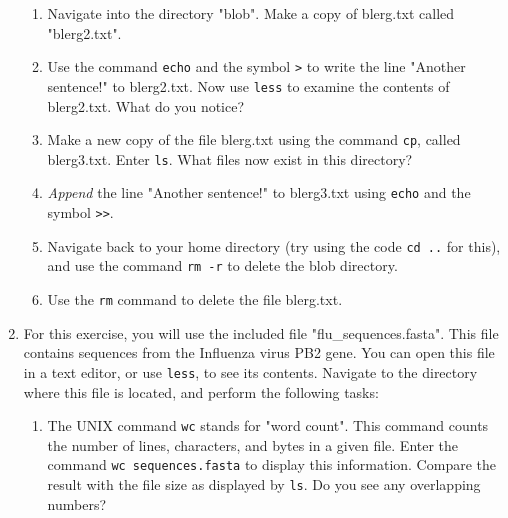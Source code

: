 \documentclass{article}[12pt]
\newcommand{\code}[1]{\texttt{#1}}  %
\begin{document}
\begin{enumerate}[itemsep=5ex]
\begin{enumerate}[itemsep=2ex]
		\item Navigate into the directory "blob". Make a copy of blerg.txt called "blerg2.txt".
		
		\item Use the command \code{echo} and the symbol \code{>} to write the line "Another sentence!" to blerg2.txt. Now use \code{less} to examine the contents of blerg2.txt. What do you notice?
		
		\item Make a new copy of the file blerg.txt using the command \code{cp}, called blerg3.txt. Enter \code{ls}. What files now exist in this directory?
		
		\item \emph{Append} the line "Another sentence!" to blerg3.txt using \code{echo} and the symbol \code{>>}. 
		
		\item Navigate back to your home directory (try using the code \code{cd ..} for this), and use the command \code{rm -r} to delete the blob directory.	
	
		\item Use the \code{rm} command to delete the file blerg.txt.
	\end{enumerate} 
	
%			
%			
	
	
	\item For this exercise, you will use the included file "flu\_sequences.fasta". This file contains sequences from the Influenza virus PB2 gene. You can open this file in a text editor, or use \code{less}, to see its contents. Navigate to the directory where this file is located, and perform the following tasks:
	\begin{enumerate}[itemsep=2ex]
		\item The UNIX command \code{wc} stands for "word count". This command counts the number of lines, characters, and bytes in a given file. Enter the command \code{wc sequences.fasta} to display this information. Compare the result with the file size as displayed by \code{ls}. Do you see any overlapping numbers?
		

\end{enumerate}
\end{enumerate}
\end{document}
